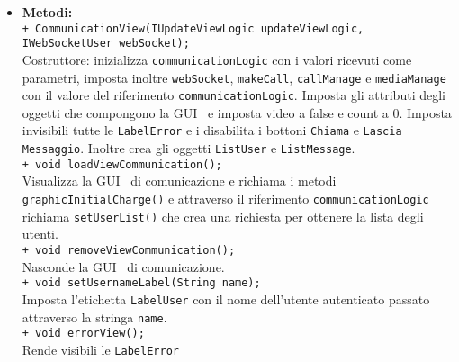 {\begin{sloppypar}
{{\begin{itemize}
					\texttt{@UiField PushButton ButtonChiudiChiamataSubmit}: bottone per l'invio della 
						richiesta di chiusura della comunicazione.\\

					\texttt{@UiField CaptionPanel CaptionChiamataInCorso}: pannello contenente \texttt{LabelTimer}.\\

					\texttt{@UiField InlineLabel LabelTimer}: label che indica lo stato di attesa del 
						mittente di una richiesta di chiamata attraverso un conto alla rovescia.\\

			\item[] \textbf{Metodi:}\\
				\texttt{+ CommunicationView(IUpdateViewLogic updateViewLogic, IWebSocketUser webSocket);}\\
				Costruttore: inizializza \texttt{communicationLogic} con i valori ricevuti come 
				parametri, imposta inoltre \texttt{webSocket}, \texttt{makeCall}, \texttt{callManage} e 
				\texttt{mediaManage} con il valore del riferimento \texttt{communicationLogic}. Imposta gli 
				attributi degli oggetti che compongono la GUI\g~ e imposta video a false e count a 0. Imposta 
				invisibili tutte le \texttt{LabelError} e i disabilita i bottoni \texttt{Chiama} e \texttt{Lascia Messaggio}. Inoltre crea gli oggetti \texttt{ListUser} e \texttt{ListMessage}.\\

				\texttt{+ void loadViewCommunication();}\\
				Visualizza la GUI\g~ di comunicazione e richiama i metodi \texttt{graphicInitialCharge()} e attraverso il riferimento \texttt{communicationLogic} richiama \texttt{setUserList()} che crea una richiesta per ottenere la lista degli utenti.\\

				\texttt{+ void removeViewCommunication();}\\
				Nasconde la GUI\g~ di comunicazione.\\

				\texttt{+ void setUsernameLabel(String name);}\\
				Imposta l'etichetta \texttt{LabelUser} con il nome dell'utente autenticato passato attraverso la stringa \texttt{name}.\\

				\texttt{+ void errorView();}\\
				Rende visibili le \texttt{LabelError}\\


\end{itemize}}}
\end{sloppypar}}

